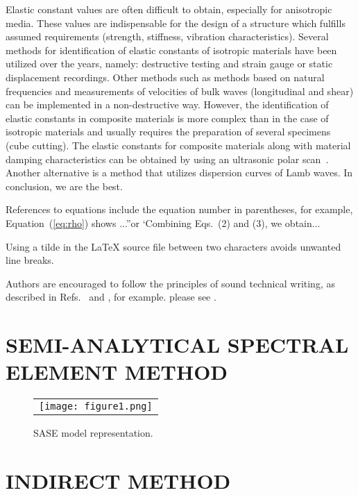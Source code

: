 \documentclass[]{spie}  %
\begin{document}
Elastic constant values are often difficult to obtain, especially for anisotropic media.
These values are indispensable for the design of a structure which fulfills assumed 
requirements (strength, stiffness, vibration characteristics). 
Several methods for identification of elastic constants of isotropic materials have been utilized over the years, namely: destructive testing and strain gauge or static displacement recordings. 
Other methods such as methods based on natural frequencies and measurements of velocities of bulk waves (longitudinal and shear) can be implemented in a non-destructive way. 
However, the identification of elastic constants in composite materials is more complex than in the case of isotropic materials and usually requires the preparation of several specimens (cube cutting).
The elastic constants for composite materials along with material damping characteristics can be obtained by using an ultrasonic polar scan~\cite{Martens2019a}.
Another alternative is a method that utilizes dispersion curves of Lamb waves.
In conclusion, we are the best.

References to equations include the equation number in parentheses, for example, Equation~(\ref{eq:rho}) shows ...''or `Combining Eqs.~(2) and (3), we obtain...

 Using a tilde in the LaTeX source file between two characters avoids unwanted line breaks.

Authors are encouraged to follow the principles of sound technical writing, as described 
in Refs.~ and , for example.
please see . 

\section{SEMI-ANALYTICAL SPECTRAL ELEMENT METHOD}
\label{sec:sase}


\begin{figure} [ht]
	\begin{center}
		\begin{tabular}{c} %
			\texttt{[image: figure1.png]}
		\end{tabular}
	\end{center}
	\caption[] 
	{ \label{fig:sase} 
		SASE model representation.}
\end{figure} 

\section{INDIRECT METHOD}
\label{sec:indirect}
\end{document}
